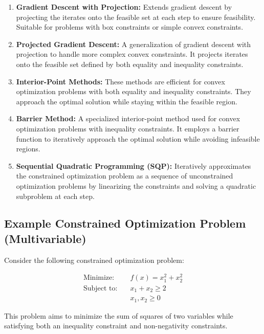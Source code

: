 \documentclass[a4paper]{article}
\begin{document}
\begin{enumerate}
\item \textbf{Gradient Descent with Projection:} Extends gradient descent by projecting the iterates onto the feasible set at each step to ensure feasibility. Suitable for problems with box constraints or simple convex constraints.

\item \textbf{Projected Gradient Descent:} A generalization of gradient descent with projection to handle more complex convex constraints. It projects iterates onto the feasible set defined by both equality and inequality constraints.

\item \textbf{Interior-Point Methods:} These methods are efficient for convex optimization problems with both equality and inequality constraints. They approach the optimal solution while staying within the feasible region.

\item \textbf{Barrier Method:} A specialized interior-point method used for convex optimization problems with inequality constraints. It employs a barrier function to iteratively approach the optimal solution while avoiding infeasible regions.

\item \textbf{Sequential Quadratic Programming (SQP):} Iteratively approximates the constrained optimization problem as a sequence of unconstrained optimization problems by linearizing the constraints and solving a quadratic subproblem at each step.
\end{enumerate}

\subsection{Example Constrained Optimization Problem (Multivariable)}

Consider the following constrained optimization problem:

\begin{align*}
\text{Minimize:} \quad & f(x) = x_1^2 + x_2^2 \\
\text{Subject to:} \quad & x_1 + x_2 \geq 2 \\
& x_1, x_2 \geq 0
\end{align*}

This problem aims to minimize the sum of squares of two variables while satisfying both an inequality constraint and non-negativity constraints.
\end{document}
